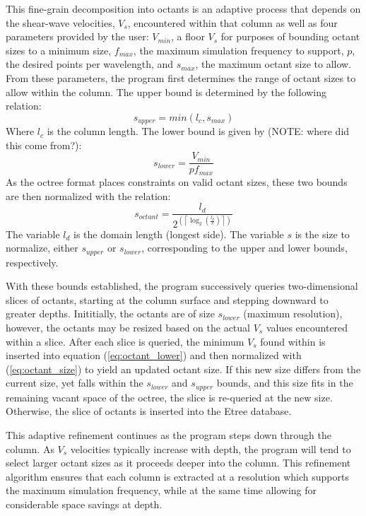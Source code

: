 This fine-grain decomposition into octants is an adaptive process that depends on the shear-wave velocities, $V_s$, encountered within that column as well as four parameters provided by the user: $V_{min}$, a floor $V_s$ for purposes of bounding octant sizes to a minimum size, $f_{max}$, the maximum simulation frequency to support, $p$, the desired points per wavelength, and $s_{max}$, the maximum octant size to allow. From these parameters, the program first determines the range of octant sizes to allow within the column. The upper bound is determined by the following relation:
\begin{equation}\label{eq:octant_upper}
s_{upper} = min(l_c, s_{max})
\end{equation}
Where $l_c$ is the column length. The lower bound is given by (NOTE: where did this come from?):
\begin{equation}\label{eq:octant_lower}
s_{lower} = \frac{V_{min}}{p f_{max}}
\end{equation}
As the octree format places constraints on valid octant sizes, these two bounds are then normalized with the relation:
\begin{equation}\label{eq:octant_size}
s_{octant} = \frac{l_{d}}{ 2^{\left( \left\lceil \log_{2}(\frac{l_{d}}{s}) \right\rceil \right)} }
\end{equation}
The variable $l_{d}$ is the domain length (longest side). The variable $s$ is the size to normalize, either $s_{upper}$ or $s_{lower}$, corresponding to the upper and lower bounds, respectively.

With these bounds established, the program successively queries two-dimensional slices of octants, starting at the column surface and stepping downward to greater depths. Inititially, the octants are of size $s_{lower}$ (maximum resolution), however, the octants may be resized based on the actual $V_s$ values encountered within a slice. After each slice is queried, the minimum $V_s$ found within is inserted into equation (\ref{eq:octant_lower}) and then normalized with (\ref{eq:octant_size}) to yield an updated octant size. If this new size differs from the current size, yet falls within the $s_{lower}$ and $s_{upper}$ bounds, and this size fits in the remaining vacant space of the octree, the slice is re-queried at the new size. Otherwise, the slice of octants is inserted into the Etree database.

This adaptive refinement continues as the program steps down through the column. As $V_s$ velocities typically increase with depth, the program will tend to select larger octant sizes as it proceeds deeper into the column. This refinement algorithm ensures that each column is extracted at a resolution which supports the maximum simulation frequency, while at the same time allowing for considerable space savings at depth.

